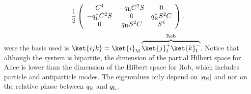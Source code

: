 \begin{equation}
\frac12\left(\begin{array}{ccc}
C^4&-q_\text{\text{L}}C^2S&0\\
-q_\text{\text{L}}^*C^2S& 0 & q_\text{\text{R}}^*S^2C \\
0& q_\text{\text{R}}S^2C & S^4 \\
\end{array}\right).
\end{equation}
were the basis used is $\ket{ijk}=\ket{i}_\text{M}\overbrace{\ket{j}_\text{I}^+\ket{k}^-_\text{I}}^{\text{Rob}}$.  Notice that although the system is bipartite, the dimension of the partial Hilbert space for Alice is lower than the dimension of the Hilbert space for Rob, which includes particle and antiparticle modes.
The eigenvalues only depend on $|q_\text{\text{R}}|$ and not on the relative phase between $q_\text{\text{R}}$ and $q_\text{\text{L}}$.

